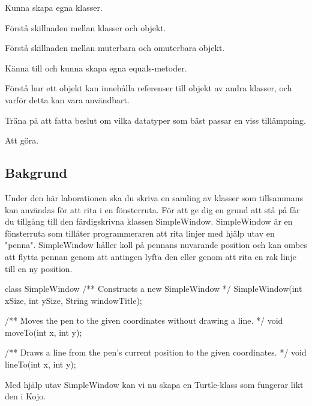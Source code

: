 

\Lab{\LabWeekSIX}

\begin{Goals}
\item Kunna skapa egna klasser.
\item Förstå skillnaden mellan klasser och objekt.
\item Förstå skillnaden mellan muterbara och omuterbara objekt.
\item Känna till och kunna skapa egna equals-metoder.
\item Förstå hur ett objekt kan innehålla referenser till objekt av andra klasser, och varför detta kan vara användbart.
\item Träna på att fatta beslut om vilka datatyper som bäst passar en viss tillämpning.
\end{Goals}

\begin{Preparations}
\item Att göra.
\end{Preparations}

\subsection{Bakgrund}

Under den här laborationen ska du skriva en samling av klasser som tillsammans kan användas för att rita i en fönsterruta. För att ge dig en grund att stå på får du tillgång till den färdigskrivna klassen SimpleWindow. SimpleWindow är en fönsterruta som tillåter programmeraren att rita linjer med hjälp utav en "penna". SimpleWindow håller koll på pennans nuvarande position och kan ombes att flytta pennan genom att antingen lyfta den eller genom att rita en rak linje till en ny position.

\begin{JavaSpec}{class SimpleWindow}
/** Constructs a new SimpleWindow */
SimpleWindow(int xSize, int ySize, String windowTitle);

/** Moves the pen to the given coordinates without
    drawing a line. */
void moveTo(int x, int y);

/** Draws a line from the pen's current position
    to the given coordinates. */
void lineTo(int x, int y);
\end{JavaSpec}

Med hjälp utav SimpleWindow kan vi nu skapa en Turtle-klass som fungerar likt den i Kojo. 

